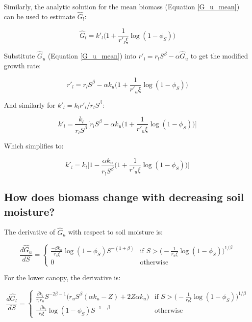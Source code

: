 \documentclass[12pt]{article}
\begin{document}
 Similarly, the analytic solution for the mean  biomass (Equation \ref{G_u_mean}) can be used to estimate  $\hat G_l$:

\begin{equation}
\hat{G}_l =
 		k'_l \bigg( 1 + \frac{1}{r'_l \xi} \log(1-\phi_S) \bigg)
\label{hatG_l}
\end{equation}
    
Substitute $\hat G_u$ (Equation \ref{G_u_mean}) into $r'_l = r_l S^\beta - \alpha \hat G_u$ to get the modified growth rate:
    
\begin{equation}
r'_l= r_l S^\beta   - \alpha k_u \big( 1 + \frac{1}{r'_u \xi} \log(1-\phi_S) \big)
\end{equation}
   
And similarly for  $k'_l  = k_l r'_l / r_l S^\beta$:
    
\begin{equation}
k'_l= \frac{k_l}{r_l S^\beta } \bigg[  r_l S^\beta   - \alpha k_u \big( 1 + \frac{1}{r'_u \xi} \log(1-\phi_S) \big) \bigg]
\end{equation}

Which simplifies to:

\begin{equation}
k'_l=  k_l  \bigg[ 1 -  \frac{  \alpha k_u} {r_l S^\beta }\big( 1 + \frac{1}{r'_u \xi} \log(1-\phi_S) \big) \bigg]
\end{equation}   

\subsection*{How does biomass change with decreasing soil moisture?}

The derivative of $\hat G_u$ with respect to soil moisture is:

\begin{equation}
\frac{ d\hat{G}_u }{dS} =
    \begin{cases}
      \frac{-\beta k_u }{r_u \xi} \log(1-\phi_S) S^{-(1+\beta)}
		& \text{if  } S > \big( - \frac{1}{r_u \xi }\log (1 - \phi_S)\big)^{1/\beta}
		\\[10pt]
      0 & \text{otherwise}
    \end{cases}       
\end{equation}


For the lower canopy, the derivative is:

\begin{equation}
\frac{ d\hat{G}_l }{dS} =
    \begin{cases}
	  \frac{\beta  {k_l} }{{r_l} {r_u}} S^{-2 \beta -1}
\big( {r_u} S^{\beta }(\alpha  {k_u}  - Z) +2 Z \alpha  {k_u} 
   \big)
	  & \text{if  } S > \big( - \frac{1}{r_l \xi }\log (1 - \phi_S)\big)^{1/\beta}
		\\[10pt]
        \frac{-\beta k_l }{r_l \xi} \log(1-\phi_S) S^{-1-\beta} & \text{otherwise}
    \end{cases}       
\end{equation}
\end{document}
